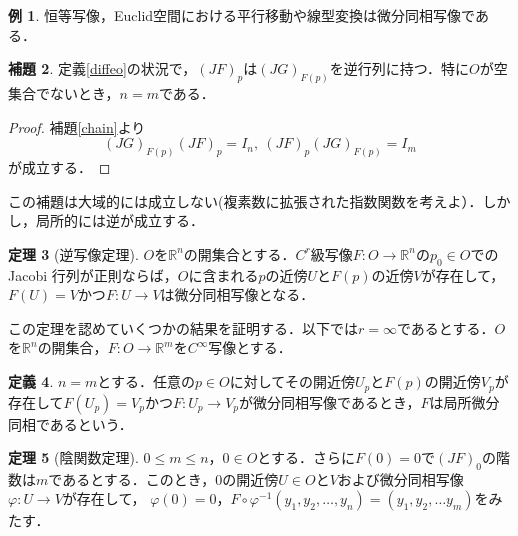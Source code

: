 ﻿\documentclass{jsarticle}
\theoremstyle{definition}
\newtheorem{theorem}{定理}[section]
\newtheorem{definition}[theorem]{定義}
\newtheorem{lemma}[theorem]{補題}
\newtheorem{example}[theorem]{例}
\newcommand{\euclid}[1]{\mathbb{R}^{#1}}
\begin{document}
\begin{example}
恒等写像，Euclid空間における平行移動や線型変換は微分同相写像である．
\end{example}

\begin{lemma}
定義\ref{diffeo}の状況で，$(JF)_p$は$(JG)_{F(p)}$を逆行列に持つ．特に$O$が空集合でないとき，$n=m$である．
\end{lemma}

\begin{proof}
補題\ref{chain}より
\[ (JG)_{F(p)}(JF)_p=I_n,\  (JF)_p(JG)_{F(p)}=I_m \]
が成立する．
\end{proof}

この補題は大域的には成立しない(複素数に拡張された指数関数を考えよ）．しかし，局所的には逆が成立する．

\begin{theorem}[逆写像定理]\label{inverse}
$O$を$\euclid{n}$の開集合とする．$C^r$級写像$F\colon O\to \euclid{n}$の$p_0\in O$でのJacobi 行列が正則ならば，$O$に含まれる$p$の近傍$U$と$F(p)$の近傍$V$が存在して，$F(U)=V$かつ$F\colon U\to V$は微分同相写像となる．
\end{theorem}

この定理を認めていくつかの結果を証明する．以下では$r=\infty$であるとする．$O$を$\euclid{n}$の開集合，$F\colon O\to \euclid{m}$を$C^\infty$写像とする．

\begin{definition}
$n=m$とする．任意の$p\in O$に対してその開近傍$U_p$と$F(p)$の開近傍$V_p$が存在して$F(U_p)=V_p$かつ$F\colon U_p\to V_p$が微分同相写像であるとき，$F$は局所微分同相であるという．
\end{definition}

\begin{theorem}[陰関数定理]\label{implicit}
$0\leq m\leq n$，$0\in O$とする．さらに$F(0)=0$で$(JF)_0$の階数は$m$であるとする．このとき，$0$の開近傍$U\in O$と$V$および微分同相写像$\varphi\colon U\to V$が存在して，
$\varphi(0)=0$，$F\circ \varphi^{-1}(y_1,y_2,\dots, y_n)=(y_1,y_2,\dots y_m)$をみたす．
\end{theorem}
\end{document}
